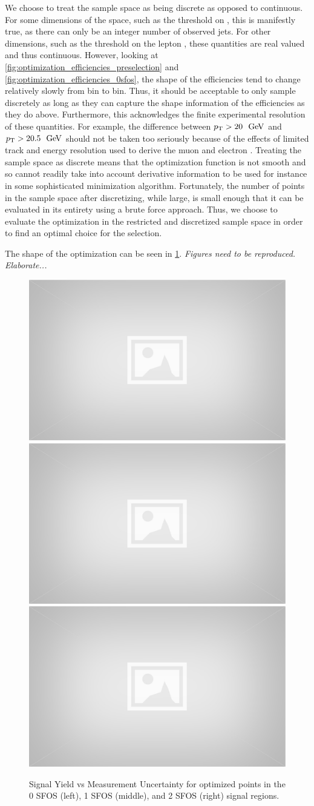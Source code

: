 We choose to treat the sample space as being discrete as opposed
to continuous. For some dimensions of the space, such as 
the threshold on \njet, this is manifestly true, as there 
can only be an integer number of observed jets. 
For other dimensions, such as the threshold on the lepton
\pt, these quantities are real valued and thus continuous.
However, looking at \fig\ref{fig:optimization_efficiencies_preselection} 
and \fig\ref{fig:optimization_efficiencies_0sfos}, the shape
of the efficiencies tend to change relatively slowly from bin
to bin. Thus, it should be acceptable to only sample 
discretely as long as they can capture the shape information of 
the efficiencies as they do above. Furthermore, 
this acknowledges the finite  experimental resolution of these 
quantities. For example,
the difference between $\pt > 20~\GeV$ and $\pt > 20.5~\GeV$
should not be taken too seriously because of the effects of limited
track and energy resolution used to derive the muon and electron \pt.
Treating the sample space as discrete means that the optimization
function is not smooth and so cannot readily take into account
derivative information to be used for instance 
in some sophisticated minimization algorithm.
Fortunately, the number of points in the sample space after discretizing, 
while large, is small enough that it can be evaluated in its entirety
using a brute force approach. Thus, we choose to evaluate the 
optimization in the restricted and discretized sample space in order
to find an optimal choice for the selection.


The shape of the optimization can be seen in \fig\ref{fig:optimization}.
\emph{Figures need to be reproduced. Elaborate...} 


\begin{figure}[ht!]
\centering
\includegraphics[width=0.3\columnwidth]{figures/placeholder.eps}
\includegraphics[width=0.3\columnwidth]{figures/placeholder.eps}
\includegraphics[width=0.3\columnwidth]{figures/placeholder.eps}
\caption{Signal Yield vs Measurement Uncertainty for optimized points 
in the 0 SFOS (left), 1 SFOS (middle), and 2 SFOS (right) signal regions.}
\label{fig:optimization}
\end{figure}




